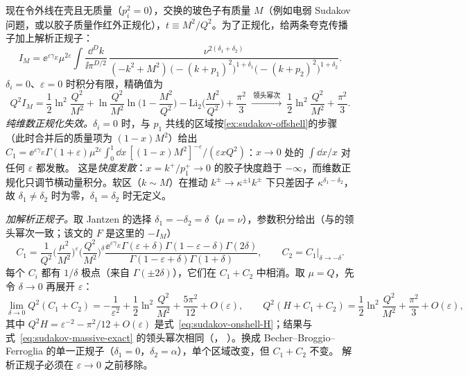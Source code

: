 \begin{example}\label{ex:sudakov-massive}
现在令外线在壳且无质量（$p_i^2=0$），交换的玻色子有质量 $M$（例如电弱 Sudakov 问题，或以胶子质量作红外正规化），$t\equiv M^2/Q^2$。为了正规化，给两条夸克传播子加上解析正规子：
\[
I_M=\ee^{\varepsilon\gamma_E}\mu^{2\varepsilon}\!\int\!\frac{\dd^Dk}{\ii\pi^{D/2}}\,\frac{\nu^{2(\delta_1+\delta_2)}}{(-k^2+M^2)\,\big(-(k+p_1)^2\big)^{1+\delta_1}\big(-(k+p_2)^2\big)^{1+\delta_2}} .
\]
$\delta_i=0$、$\varepsilon=0$ 时积分有限，精确值为\cite[式~(6.30)]{Jantzen2011}
\begin{equation}\label{eq:sudakov-massive-exact}
Q^2I_M=\frac12\ln^2\frac{Q^2}{M^2}+\ln\frac{Q^2}{M^2}\ln\Big(1-\frac{M^2}{Q^2}\Big)-\mathrm{Li}_2\Big(\frac{M^2}{Q^2}\Big)+\frac{\pi^2}3
\ \xrightarrow{\ \text{领头幂次}\ }\ \frac12\ln^2\frac{Q^2}{M^2}+\frac{\pi^2}3 .
\end{equation}
\emph{纯维数正规化失效。}$\delta_i=0$ 时，与 $p_1$ 共线的区域按\cref{ex:sudakov-offshell}的步骤（此时合并后的质量项为 $(1-x)M^2$）给出
$C_1=\ee^{\varepsilon\gamma_E}\Gamma(1+\varepsilon)\mu^{2\varepsilon}\int_0^1\dd x\,[(1-x)M^2]^{-\varepsilon}/(\varepsilon xQ^2)$：$x\to0$ 处的 $\int\dd x/x$ 对任何 $\varepsilon$ 都发散。
这是\emph{快度发散}：$x=k^+/p_1^+\to0$ 的胶子快度趋于 $-\infty$，而维数正规化只调节横动量积分。软区（$k\sim M$）在推动 $k^\pm\to\kappa^{\pm1}k^\pm$ 下只差因子 $\kappa^{\delta_1-\delta_2}$，
故 $\delta_1\ne\delta_2$ 时为零，$\delta_1=\delta_2$ 时无定义。

\emph{加解析正规子。}取 Jantzen 的选择 $\delta_1=-\delta_2=\delta$（$\mu=\nu$），参数积分给出（与\cite[式~(6.27)]{Jantzen2011}的领头幂次一致；该文的 $F$ 是这里的 $-I_M$）
\[
C_1=\frac{1}{Q^2}\Big(\frac{\mu^2}{M^2}\Big)^{\varepsilon}\Big(\frac{Q^2}{M^2}\Big)^{\delta}\frac{\ee^{\varepsilon\gamma_E}\Gamma(\varepsilon+\delta)\Gamma(1-\varepsilon-\delta)\Gamma(2\delta)}{\Gamma(1-\varepsilon+\delta)\Gamma(1+\delta)},\qquad
C_2=C_1\big|_{\delta\to-\delta}.
\]
每个 $C_i$ 都有 $1/\delta$ 极点（来自 $\Gamma(\pm2\delta)$），它们在 $C_1+C_2$ 中相消。取 $\mu=Q$，先令 $\delta\to0$ 再展开 $\varepsilon$：
\begin{equation}\label{eq:sudakov-massive-regions}
\lim_{\delta\to0}Q^2(C_1+C_2)=-\frac1{\varepsilon^2}+\frac12\ln^2\frac{Q^2}{M^2}+\frac{5\pi^2}{12}+O(\varepsilon),\qquad
Q^2(H+C_1+C_2)=\frac12\ln^2\frac{Q^2}{M^2}+\frac{\pi^2}3+O(\varepsilon),
\end{equation}
其中 $Q^2H=\varepsilon^{-2}-\pi^2/12+O(\varepsilon)$ 是式~\eqref{eq:sudakov-onshell-H}；结果与式~\eqref{eq:sudakov-massive-exact} 的领头幂次相同（\cite[式~(6.29)--(6.30)]{Jantzen2011}，
\cite[第~2.3~节，式~(2.50)--(2.52)]{BecherBroggioFerroglia2015}）。换成 Becher--Broggio--Ferroglia 的单一正规子（$\delta_1=0$，$\delta_2=\alpha$），单个区域改变，但 $C_1+C_2$ 不变。
解析正规子必须在 $\varepsilon\to0$ 之前移除。


\end{example}
